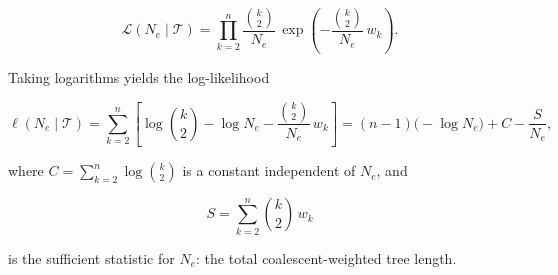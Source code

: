 \documentclass[11pt, a4paper]{article}
\begin{document}
\begin{equation}
    \mathcal{L}(N_e \mid \mathcal{T})
    = \prod_{k=2}^{n}
      \frac{\binom{k}{2}}{N_e}\,
      \exp\!\left(-\frac{\binom{k}{2}}{N_e}\,w_k\right).
    \label{eq:coallikelihood}
\end{equation}

Taking logarithms yields the log-likelihood

\begin{equation}
    \ell(N_e \mid \mathcal{T})
    = \sum_{k=2}^{n}\left[\log\binom{k}{2} - \log N_e
      - \frac{\binom{k}{2}}{N_e}\,w_k\right]
    = (n-1)\bigl(-\log N_e\bigr) + C - \frac{S}{N_e},
    \label{eq:loglik}
\end{equation}

where $C = \sum_{k=2}^{n}\log\binom{k}{2}$ is a constant independent of $N_e$, and

\begin{equation}
    S = \sum_{k=2}^{n} \binom{k}{2}\,w_k
    \label{eq:sstat}
\end{equation}

is the sufficient statistic for $N_e$: the total coalescent-weighted tree length.
\end{document}
